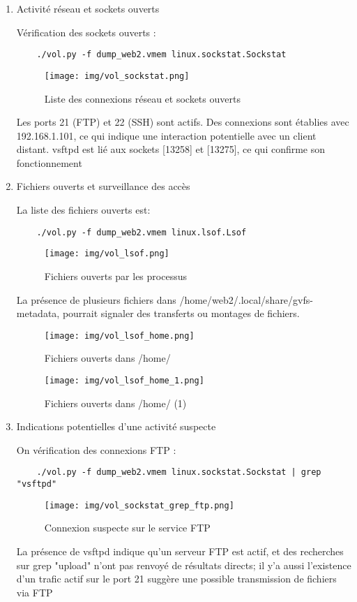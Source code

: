 \documentclass[a4paper,12pt]{report}
\begin{document}
\begin{enumerate}
\item{Activité réseau et sockets ouverts}

    Vérification des sockets ouverts :
    \begin{verbatim}
    ./vol.py -f dump_web2.vmem linux.sockstat.Sockstat
    \end{verbatim}
    \begin{figure}[H]
        \centering
        \texttt{[image: img/vol\_sockstat.png]}
        \caption{Liste des connexions réseau et sockets ouverts}
    \end{figure}
Les ports 21 (FTP) et 22 (SSH) sont actifs.
Des connexions sont établies avec 192.168.1.101, ce qui indique une interaction potentielle avec un client distant.
vsftpd est lié aux sockets [13258] et [13275], ce qui confirme son fonctionnement

\item{Fichiers ouverts et surveillance des accès}

    La liste des fichiers ouverts est:
    \begin{verbatim}
    ./vol.py -f dump_web2.vmem linux.lsof.Lsof
    \end{verbatim}
    \begin{figure}[H]
        \centering
        \texttt{[image: img/vol\_lsof.png]}
        \caption{Fichiers ouverts par les processus}
    \end{figure}
La présence de plusieurs fichiers dans /home/web2/.local/share/gvfs-metadata, pourrait signaler des transferts ou montages de fichiers.

 \begin{figure}[H]
        \centering
        \texttt{[image: img/vol\_lsof\_home.png]}
        \caption{Fichiers ouverts dans /home/}
    \end{figure}

    \begin{figure}[H]
        \centering
        \texttt{[image: img/vol\_lsof\_home\_1.png]}
        \caption{Fichiers ouverts dans /home/ (1)}
    \end{figure}
\item{Indications potentielles d’une activité suspecte}

    On vérification des connexions FTP :
    \begin{verbatim}
    ./vol.py -f dump_web2.vmem linux.sockstat.Sockstat | grep "vsftpd"
    \end{verbatim}
    \begin{figure}[h]
        \centering
        \texttt{[image: img/vol\_sockstat\_grep\_ftp.png]}
        \caption{Connexion suspecte sur le service FTP}
    \end{figure}

La présence de vsftpd indique qu’un serveur FTP est actif, et des recherches sur grep "upload" n’ont pas renvoyé de résultats directs;
il y'a aussi l'existence d’un trafic actif sur le port 21 suggère une possible transmission de fichiers via FTP

\end{enumerate}
\end{document}
